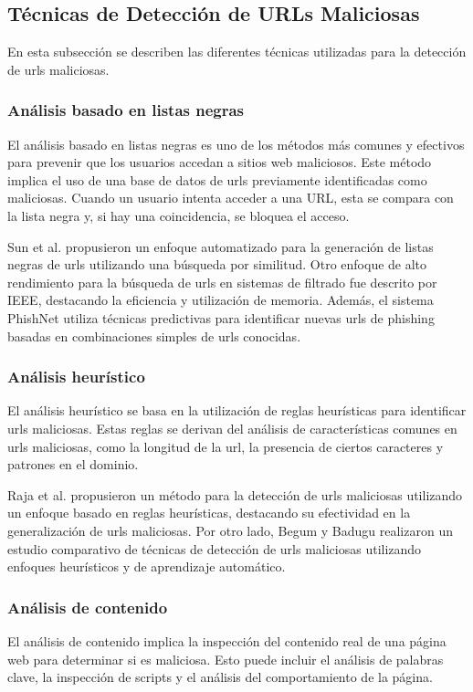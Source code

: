 \subsection{Técnicas de Detección de URLs Maliciosas}
En esta subsección se describen las diferentes técnicas utilizadas para la detección de \glspl{url} maliciosas.

\subsubsection*{Análisis basado en listas negras}
El análisis basado en listas negras es uno de los métodos más comunes y efectivos para prevenir que los usuarios accedan a sitios web maliciosos. Este método implica el uso de una base de datos de \glspl{url} previamente identificadas como maliciosas. Cuando un usuario intenta acceder a una URL, esta se compara con la lista negra y, si hay una coincidencia, se bloquea el acceso.

Sun et al. propusieron un enfoque automatizado para la generación de listas negras de \glspl{url} utilizando una búsqueda por similitud\autocite{sun2016automating}. Otro enfoque de alto rendimiento para la búsqueda de \glspl{url} en sistemas de filtrado fue descrito por IEEE, destacando la eficiencia y utilización de memoria\autocite{ieee2010lookup}. Además, el sistema PhishNet utiliza técnicas predictivas para identificar nuevas \glspl{url} de phishing basadas en combinaciones simples de \glspl{url} conocidas\autocite{ieee2010phishnet}.

\subsubsection*{Análisis heurístico}
El análisis heurístico se basa en la utilización de reglas heurísticas para identificar \glspl{url} maliciosas. Estas reglas se derivan del análisis de características comunes en \glspl{url} maliciosas, como la longitud de la \gls{url}, la presencia de ciertos caracteres y patrones en el dominio.

Raja et al. propusieron un método para la detección de \glspl{url} maliciosas utilizando un enfoque basado en reglas heurísticas, destacando su efectividad en la generalización de \glspl{url} maliciosas\autocite{raja2022mudhr}. Por otro lado, Begum y Badugu realizaron un estudio comparativo de técnicas de detección de \glspl{url} maliciosas utilizando enfoques heurísticos y de aprendizaje automático\autocite{begum2019study}.

\subsubsection*{Análisis de contenido}
El análisis de contenido implica la inspección del contenido real de una página web para determinar si es maliciosa. Esto puede incluir el análisis de palabras clave, la inspección de scripts y el análisis del comportamiento de la página.

